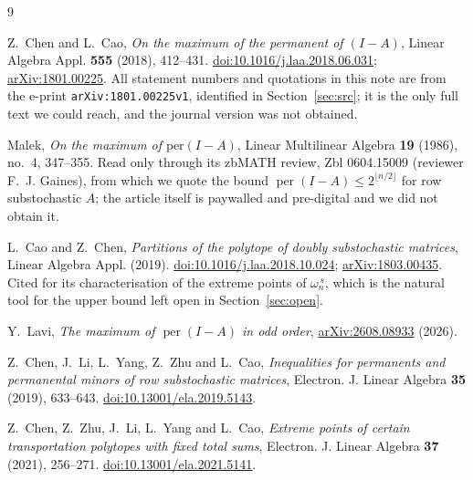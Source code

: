\documentclass[11pt]{amsart}
\theoremstyle{remark}
\DeclareMathOperator{\per}{per}
\newcommand{\ws}{\omega}
\begin{document}
\begin{thebibliography}{9}

Z.~Chen and L.~Cao,
\emph{On the maximum of the permanent of $(I-A)$},
Linear Algebra Appl. \textbf{555} (2018), 412--431.
\href{https://doi.org/10.1016/j.laa.2018.06.031}{doi:10.1016/j.laa.2018.06.031};
\href{https://arxiv.org/abs/1801.00225}{arXiv:1801.00225}.
All statement numbers and quotations in this note are from the e-print
\texttt{arXiv:1801.00225v1}, identified in Section~\ref{sec:src}; it is
the only full text we could reach, and the journal version was not obtained.

Malek,
\emph{On the maximum of $\mathrm{per}(I-A)$},
Linear Multilinear Algebra \textbf{19} (1986), no.~4, 347--355.
Read only through its zbMATH review, Zbl 0604.15009 (reviewer F.~J. Gaines), from
which we quote the bound $\per(I-A)\le2^{\lfloor n/2\rfloor}$ for row substochastic
$A$; the article itself is paywalled and pre-digital and we did not obtain it.

L.~Cao and Z.~Chen,
\emph{Partitions of the polytope of doubly substochastic matrices},
Linear Algebra Appl. (2019).
\href{https://doi.org/10.1016/j.laa.2018.10.024}{doi:10.1016/j.laa.2018.10.024};
\href{https://arxiv.org/abs/1803.00435}{arXiv:1803.00435}.
Cited for its characterisation of the extreme points of $\ws_n^{\,s}$, which is the
natural tool for the upper bound left open in Section~\ref{sec:open}.

Y.~Lavi,
\emph{The maximum of $\per(I-A)$ in odd order},
\href{https://arxiv.org/abs/2608.08933}{arXiv:2608.08933} (2026).

Z.~Chen, J.~Li, L.~Yang, Z.~Zhu and L.~Cao,
\emph{Inequalities for permanents and permanental minors of row substochastic
matrices},
Electron. J. Linear Algebra \textbf{35} (2019), 633--643.
\href{https://doi.org/10.13001/ela.2019.5143}{doi:10.13001/ela.2019.5143}.

Z.~Chen, Z.~Zhu, J.~Li, L.~Yang and L.~Cao,
\emph{Extreme points of certain transportation polytopes with fixed total sums},
Electron. J. Linear Algebra \textbf{37} (2021), 256--271.
\href{https://doi.org/10.13001/ela.2021.5141}{doi:10.13001/ela.2021.5141}.

\end{thebibliography}
\end{document}
